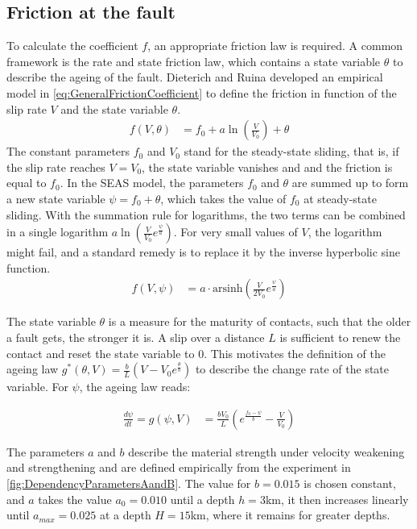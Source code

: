 \subsection{Friction at the fault}
\label{ssec:FrictionLaws}
To calculate the coefficient $f$, an appropriate friction law is required. A common framework is the rate and state friction law, which contains a state variable $\theta$ to describe the ageing of the fault. Dieterich \cite{Dieterich79}\cite{Dieterich81} and Ruina \cite{Ruina} developed an empirical model in \autoref{eq:GeneralFrictionCoefficient} to define the friction in function of the slip rate $V$ and the state variable $\theta$. 
\begin{align}
	\label{eq:GeneralFrictionCoefficient}
	f(V,\theta) &= f_0 + a\ln(\frac{V}{V_0}) + \theta
\end{align}
The constant parameters $f_0$ and $V_0$ stand for the steady-state sliding, that is, if the slip rate reaches $V=V_0$, the state variable vanishes and and the friction is equal to $f_0$. In the SEAS model, the parameters $f_0$ and $\theta$ are summed up to form a new state variable $\psi = f_0 +\theta$, which takes the value of $f_0$ at steady-state sliding. With the summation rule for logarithms, the two terms can be combined in a single logarithm $a\ln(\frac{V}{V_0}e^{\frac{\psi}{a}})$. For very small values of $V$, the logarithm might fail, and a standard remedy \cite{Lapusta} is to replace it by the inverse hyperbolic sine function. 
\begin{align}
\label{eq:SEASFrictionCoefficient}
	f(V, \psi) &= a\cdot \text{arsinh}\left(\frac{V}{2V_0}e^{\frac{\psi}{a}}\right)
\end{align}

The state variable $\theta$ is a measure for the maturity of contacts, such that the older a fault gets, the stronger it is. A slip over a distance $L$ is sufficient to renew the contact and reset the state variable to 0. This motivates the definition of the ageing law $g^*(\theta, V) = \frac{b}{L}\left(V - V_0e^{\frac{\theta}{b}}\right)$ to describe the change rate of the state variable. For $\psi$, the ageing law reads: 

\begin{align}
	\label{eq:GeneralAgeingLaw}
	\frac{d\psi}{dt} = g(\psi, V) &= \frac{bV_0}{L}\left(e^{\frac{f_0 - \psi}{b}} - \frac{V}{V_0}\right)
\end{align}

The parameters $a$ and $b$ describe the material strength under velocity weakening and strengthening and are defined empirically from the experiment in \autoref{fig:DependencyParametersAandB}. The value for $b=0.015$ is chosen constant, and $a$ takes the value $a_0=0.010$ until a depth $h=3$km, it then increases linearly until $a_{max}=0.025$ at a depth $H=15$km, where it remains for greater depths. 

